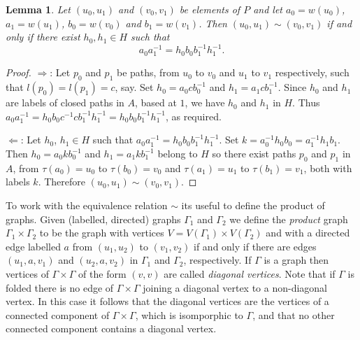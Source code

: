 \documentclass[a4paper,12pt]{article}
\newcommand{\G}{\Gamma }
\renewcommand{\t}{\tau }
\newtheorem{lemma}[theorem]{Lemma}
\numberwithin{equation}{section}
\numberwithin{figure}{section}
\begin{document}
\begin{lemma}\label{lem:equiv_verts}
Let $(u_0,u_1)$ and $(v_0,v_1)$ be elements of $P$ and let
$a_0=w(u_0)$, $a_1=w(u_1)$, $b_0=w(v_0)$ and $b_1=w(v_1)$. Then
$(u_0,u_1)\sim (v_0,v_1)$ if and only if there exist $h_0,h_1\in H$ such that
\[a_0a_1^{-1}=h_0b_0b_1^{-1}h_1^{-1}.\]
\end{lemma}
\begin{proof}
$\Rightarrow$: Let $p_0$ and $p_1$ be paths, from $u_0$ to $v_0$ and $u_1$ to $v_1$
respectively, such that $l(p_0)=l(p_1)=c$, say. Set $h_0=a_0cb_0^{-1}$ and
$h_1=a_1cb_1^{-1}$. Since $h_0$ and $h_1$ are labels of closed paths in $A$, based at $1$, we
have $h_0$ and $h_1$ in $H$. Thus
$a_0a_1^{-1}=h_0b_0c^{-1}cb_1^{-1}h_1^{-1}=h_0b_0b_1^{-1}h_1^{-1}$, as required.

$\Leftarrow$: Let $h_0$, $h_1 \in H$ such that $a_0a_1^{-1}=h_0b_0b_1^{-1}h_1^{-1}$.
Set $k=a_0^{-1}h_0b_0=a_1^{-1}h_1b_1$. Then $h_0=a_0kb_0^{-1}$ and $h_1=a_1kb_1^{-1}$
belong to $H$ so there exist paths $p_0$ and $p_1$ in $A$,
from $\t(a_0)=u_0$ to $\t(b_0)=v_0$ and
$\t(a_1)=u_1$ to $\t(b_1)=v_1$, both with labels $k$.
Therefore $(u_0,u_1)\sim (v_0,v_1)$.
\end{proof}


To work with the equivalence relation $\sim$ its useful to define
the product of graphs. Given (labelled, directed) 
graphs $\G_1$ and $\G_2$ we define the {\em
product} graph $\G_1\times \G_2$ to be the graph with vertices
$V=V(\G_1)\times V(\G_2)$ and with a directed edge labelled $a$
from $(u_1,u_2)$ to $(v_1,v_2)$ if and only if there are edges
$(u_1,a, v_1)$ and $(u_2,a,v_2)$ in $\G_1$ and $\G_2$,
respectively. If $\G$ is a graph then 
vertices of $\G\times \G$ of 
 the form $(v,v)$ are called {\em diagonal vertices}. 
Note that if
$\G$ is folded there is no edge of $\G\times \G$ 
joining a diagonal vertex to a non-diagonal
vertex. In this case it 
follows that the diagonal vertices are the vertices of a 
connected component of $\G\times \G$, which is isomporphic to $\G$, and 
that no other connected component contains a diagonal vertex. 
\end{document}
